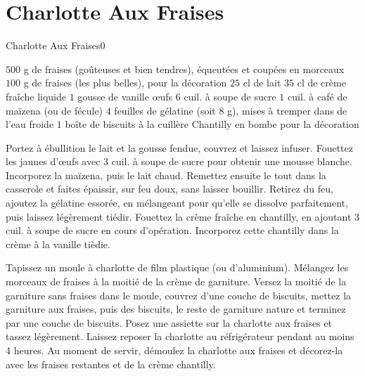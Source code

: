 {\section{Charlotte Aux Fraises}
\begin{recette}{Charlotte Aux Fraises}{0}{}{}
\begin{ingredients}[6 pers.]
\ingredient $500$ g de fraises (goûteuses et bien tendres), équeutées et coupées en morceaux
\ingredient $100$ g de fraises (les plus belles), pour la décoration
\ingredient $25$ cl de lait
\ingredient $35$ cl de crème fraîche liquide
\ingredient $1$ gousse de vanille
 œufs
\ingredient $6$ cuil. à soupe de sucre
\ingredient $1$ cuil. à café de maïzena (ou de fécule)
\ingredient $4$ feuilles de gélatine (soit 8 g), mises à tremper dans de l'eau froide
\ingredient $1$ boîte de biscuits à la cuillère
\ingredient Chantilly en bombe pour la décoration
\end{ingredients}

\begin{preparation}
\etape Portez à ébullition le lait et la gousse fendue, couvrez et laissez infuser.
\etape Fouettez les jaunes d'œufs avec 3 cuil. à soupe de sucre pour obtenir une mousse blanche.
\etape Incorporez la maïzena, puis le lait chaud.
\etape Remettez ensuite le tout dans la casserole et faites épaissir, sur feu doux, sans laisser bouillir.
\etape Retirez du feu, ajoutez la gélatine essorée, en mélangeant pour qu'elle se dissolve parfaitement, puis laissez légèrement 
tiédir.
\etape Fouettez la crème fraîche en chantilly, en ajoutant 3 cuil. à soupe de sucre en cours d'opération.
\etape Incorporez cette chantilly dans la crème à la vanille tièdie.

\etape Tapissez un moule à charlotte de film plastique (ou d'aluminium).
\etape Mélangez les morceaux de fraises à la moitié de la crème de garniture.
\etape Versez la moitié de la garniture sans fraises dans le moule, couvrez d'une couche de biscuits, mettez la garniture aux 
fraises, puis des biscuits, le reste de garniture nature et terminez par une couche de biscuits.
\etape Posez une assiette sur la charlotte aux fraises et tassez légèrement.
\etape Laissez reposer la charlotte au réfrigérateur pendant au moins 4 heures.
\etape Au moment de servir, démoulez la charlotte aux fraises et décorez-la avec les fraises restantes et de la crème chantilly.
\end{preparation}
\end{recette}

}
